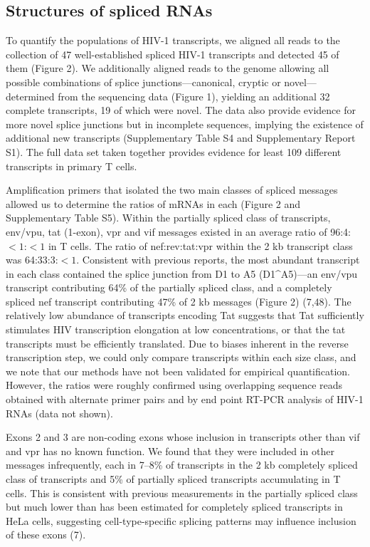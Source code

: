 \documentclass[../sherrill-Mix_thesis.tex]{subfiles}
\begin{document}
\subsection{Structures of spliced \hivEight{} RNAs}
To quantify the populations of HIV-1 transcripts, we aligned all reads to the collection of 47 well-established spliced HIV-1 transcripts and detected 45 of them (Figure 2). We additionally aligned reads to the \hivEight{} genome allowing all possible combinations of splice junctions---canonical, cryptic or novel---determined from the sequencing data (Figure 1), yielding an additional 32 complete transcripts, 19 of which were novel. The data also provide evidence for more novel splice junctions but in incomplete sequences, implying the existence of additional new transcripts (Supplementary Table S4 and Supplementary Report S1). The full data set taken together provides evidence for least 109 different \hivEight{} transcripts in primary T cells.

Amplification primers that isolated the two main classes of spliced messages allowed us to determine the ratios of mRNAs in each (Figure 2 and Supplementary Table S5). Within the partially spliced class of transcripts, env/vpu, tat (1-exon), vpr and vif messages existed in an average ratio of 96:4:$<1$:$<1$ in \cdFour{} T cells. The ratio of nef:rev:tat:vpr within the \approximately{}2 kb transcript class was 64:33:3:$<1$. Consistent with previous reports, the most abundant transcript in each class contained the splice junction from D1 to A5 (D1\^{}A5)---an env/vpu transcript contributing 64\% of the partially spliced class, and a completely spliced nef transcript contributing 47\% of \approximately{}2 kb messages (Figure 2) (7,48). The relatively low abundance of transcripts encoding Tat suggests that Tat sufficiently stimulates HIV transcription elongation at low concentrations, or that the tat transcripts must be efficiently translated. Due to biases inherent in the reverse transcription step, we could only compare transcripts within each size class, and we note that our methods have not been validated for empirical quantification. However, the ratios were roughly confirmed using overlapping sequence reads obtained with alternate primer pairs and by end point RT-PCR analysis of HIV-1 RNAs (data not shown).

Exons 2 and 3 are non-coding exons whose inclusion in transcripts other than vif and vpr has no known function. We found that they were included in other messages infrequently, each in \approximately{}7--8\% of transcripts in the \approximately{}2 kb completely spliced class of transcripts and 5\% of partially spliced transcripts accumulating in T cells. This is consistent with previous measurements in the partially spliced class but much lower than has been estimated for completely spliced transcripts in HeLa cells, suggesting cell-type-specific splicing patterns may influence inclusion of these exons (7). 
\end{document}
